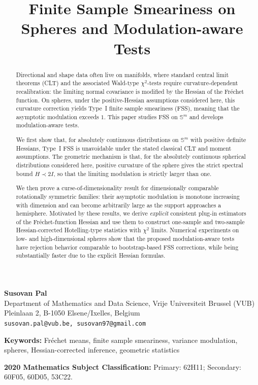 \documentclass{amsart}
\theoremstyle{definition}
\theoremstyle{remark}
\newcommand\0{\boldsymbol{0}}
\begin{document}

\title{Finite Sample Smeariness on Spheres and Modulation-aware Tests}
\vspace{-8mm}
\maketitle
\begin{center}
  \textbf{Susovan Pal} \\
  Department of Mathematics and Data Science, Vrije Universiteit Brussel (VUB) \\
  Pleinlaan 2, B-1050 Elsene/Ixelles, Belgium \\
  \texttt{susovan.pal@vub.be, susovan97@gmail.com}

\end{center}

\noindent\textbf{Keywords:} Fr\'echet means, finite sample smeariness, variance modulation, spheres, Hessian-corrected inference, geometric statistics

\noindent\textbf{2020 Mathematics Subject Classification:}
Primary: 62H11; Secondary: 60F05, 60D05, 53C22.

\tableofcontents

\begin{abstract}
Directional and shape data often live on manifolds, where standard central limit theorems (CLT) and the associated Wald-type \(\chi^2\)-tests require curvature-dependent recalibration: the limiting normal covariance is modified by the Hessian of the Fr\'echet function. On spheres, under the positive-Hessian assumptions considered here, this curvature correction yields Type~I finite sample smeariness (FSS), meaning that the asymptotic modulation exceeds \(1\). This paper studies FSS on \(\mathbb{S}^m\) and develops modulation-aware tests.

We first show that, for absolutely continuous distributions on \(\mathbb{S}^m\) with positive definite Hessians, Type~I FSS is unavoidable under the stated classical CLT and moment assumptions. The geometric mechanism is that, for the absolutely continuous spherical distributions considered here, positive curvature of the sphere gives the strict spectral bound \(H \prec 2I\), so that the limiting modulation is strictly larger than one.

We then prove a curse-of-dimensionality result for dimensionally comparable rotationally symmetric families: their asymptotic modulation is monotone increasing with dimension and can become arbitrarily large as the support approaches a hemisphere. Motivated by these results, we derive \textit{explicit} consistent plug-in estimators of the Fr\'echet-function Hessian and use them to construct one-sample and two-sample Hessian-corrected Hotelling-type statistics with \(\chi^2\) limits. Numerical experiments on low- and high-dimensional spheres show that the proposed modulation-aware tests have rejection behavior comparable to bootstrap-based FSS corrections, while being substantially faster due to the explicit Hessian formulas.
\end{abstract}
\end{document}
